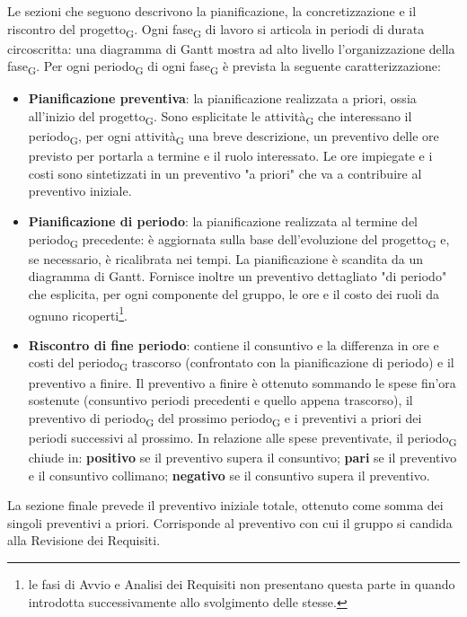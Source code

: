 Le sezioni che seguono descrivono la pianificazione, la concretizzazione e il riscontro del progetto\textsubscript{G}. Ogni fase\textsubscript{G} di lavoro si articola in periodi di durata circoscritta: una diagramma di Gantt mostra ad alto livello l'organizzazione della fase\textsubscript{G}. Per ogni periodo\textsubscript{G} di ogni fase\textsubscript{G} è prevista la seguente caratterizzazione:
\begin{itemize}
	\item \textbf{Pianificazione preventiva}: la pianificazione realizzata a priori, ossia all'inizio del progetto\textsubscript{G}. Sono esplicitate le attività\textsubscript{G} che interessano il periodo\textsubscript{G}, per ogni attività\textsubscript{G} una breve descrizione, un preventivo delle ore previsto per portarla a termine e il ruolo interessato. Le ore impiegate e i costi sono sintetizzati in un preventivo "a priori" che va a contribuire al preventivo iniziale.
	
	\item \textbf{Pianificazione di periodo}: la pianificazione realizzata al termine del periodo\textsubscript{G} precedente: è aggiornata sulla base dell'evoluzione del progetto\textsubscript{G} e, se necessario, è ricalibrata nei tempi. La pianificazione è scandita da un diagramma di Gantt. Fornisce inoltre un preventivo dettagliato "di periodo" che esplicita, per ogni componente del gruppo, le ore e il costo dei ruoli da ognuno ricoperti\footnote{le fasi di Avvio e Analisi dei Requisiti non presentano questa parte in quando introdotta successivamente allo svolgimento delle stesse.}.
	
	\item \textbf{Riscontro di fine periodo}: contiene il consuntivo e la differenza in ore e costi del periodo\textsubscript{G} trascorso (confrontato con la pianificazione di periodo) e il preventivo a finire. Il preventivo a finire è ottenuto sommando le spese fin'ora sostenute (consuntivo periodi precedenti e quello appena trascorso), il preventivo di periodo\textsubscript{G} del prossimo periodo\textsubscript{G} e i preventivi a priori dei periodi successivi al prossimo. In relazione alle spese preventivate, il periodo\textsubscript{G} chiude in: \textbf{positivo} se il preventivo supera il consuntivo; \textbf{pari} se il preventivo e il consuntivo collimano; \textbf{negativo} se il consuntivo supera il preventivo.
	
\end{itemize}

La sezione finale prevede il preventivo iniziale totale, ottenuto come somma dei singoli preventivi a priori. Corrisponde al preventivo con cui il gruppo si candida alla Revisione dei Requisiti.
